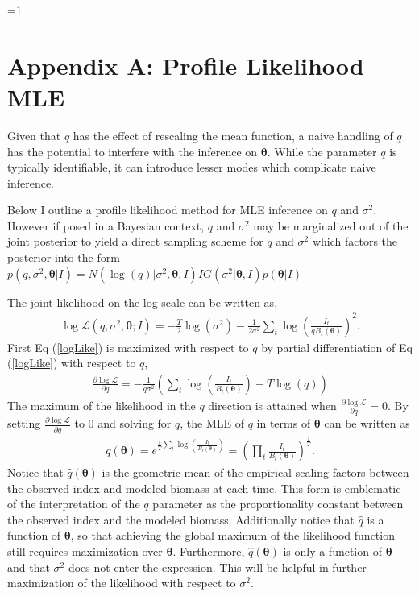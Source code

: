 \documentclass[12pt]{article}
\newcounter{alphasect}
\def\alphainsection{0}
\let\oldsection=\section
\def\section{%
  \ifnum\alphainsection=1%
    \addtocounter{alphasect}{1}
  \fi%
\oldsection}%
\begin{document}
\clearpage
\section*{Appendix A: Profile Likelihood MLE \label{appMLE}}
Given that $q$ has the effect of rescaling the mean function, a 
naive handling of $q$ has the potential to interfere with the inference on 
$\bm{\theta}$. While the parameter $q$ is typically identifiable, it can 
introduce lesser modes which complicate naive inference.

%
Below I outline a profile likelihood method for MLE inference on $q$ and 
$\sigma^2$. However if posed in a %
Bayesian context, $q$ and 
$\sigma^2$ may be marginalized out of the joint posterior to yield a direct 
sampling scheme for $q$ and $\sigma^2$ which factors the posterior into the 
form $p(q, \sigma^2, \bm{\theta}|I) = N(\log(q)| \sigma^2, \bm{\theta}, I) IG(\sigma^2|\bm{\theta}, I) p(\bm{\theta}|I)$ 

%
The joint likelihood on the log scale can be written as, 
\begin{align}
\log\mathcal{L}(q, \sigma^2, \bm{\theta}; I) = - \frac{T}{2}\log(\sigma^2) - \frac{1}{2\sigma^2}\sum_t \log\left(\frac{I_t}{qB_t(\bm{\theta})}\right)^2. \label{logLike} 
\end{align}
%
First Eq (\ref{logLike}) is maximized with respect to $q$ by partial 
differentiation of Eq (\ref{logLike}) with respect to $q$, 
%
\begin{align}
\frac{\partial \log\mathcal{L}}{\partial q} = -\frac{1}{q\sigma^2}\left(\sum_t \log\left(\frac{I_t}{B_t(\bm{\theta})}\right) - T\log(q)\right)
\end{align}
%
The maximum of the likelihood in the $q$ direction is attained when 
$\frac{\partial \log\mathcal{L}}{\partial q}=0$. By setting 
$\frac{\partial \log\mathcal{L}}{\partial q}$ to 0 and solving for 
$q$, the MLE of $q$ in terms of $\bm{\theta}$ can be written as
%
\begin{align}
q(\bm{\theta}) = e^{ \frac{1}{T}\sum_t \log\left(\frac{I_t}{B_t(\bm{\theta})}\right) } = \left(\prod_t\frac{I_t}{B_t(\bm{\theta})}\right)^{\frac{1}{T}}. \label{qHat}
\end{align}
%
Notice that $\hat q(\bm{\theta})$ is the geometric mean of the empirical 
scaling factors between the observed index and modeled biomass at each time. 
This form is emblematic of the interpretation of the $q$ parameter as the 
proportionality constant between the observed index and the modeled biomass. 
Additionally notice that $\hat q$ is a function of $\bm\theta$, so that 
achieving the global maximum of the likelihood function still requires 
maximization over $\bm\theta$. Furthermore, $\hat q(\bm{\theta})$ is only a 
function of $\bm{\theta}$ and that $\sigma^2$ does not enter the expression.  
This will be helpful in further maximization of the likelihood with respect to 
$\sigma^2$.  
\end{document}

